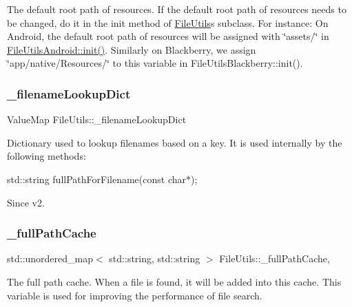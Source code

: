 The default root path of resources. If the default root path of resources needs to be changed, do it in the {\ttfamily init} method of \hyperlink{classFileUtils}{File\+Utils}\textquotesingle{}s subclass. For instance\+: On Android, the default root path of resources will be assigned with \char`\"{}assets/\char`\"{} in \hyperlink{classFileUtilsAndroid_a5ff9d802609690baa039ebef0508b2c6}{File\+Utils\+Android\+::init()}. Similarly on Blackberry, we assign \char`\"{}app/native/\+Resources/\char`\"{} to this variable in File\+Utils\+Blackberry\+::init(). \mbox{\label{classFileUtils_a3d6f18571f845268f614048092f74c76}} 
\subsubsection{\texorpdfstring{\+\_\+filename\+Lookup\+Dict}{\_filenameLookupDict}}
{\footnotesize\ttfamily Value\+Map File\+Utils\+::\+\_\+filename\+Lookup\+Dict\hspace{0.3cm}{\ttfamily [protected]}}

Dictionary used to lookup filenames based on a key. It is used internally by the following methods\+:

std\+::string full\+Path\+For\+Filename(const char$\ast$);

\begin{DoxySince}{Since}
v2. 
\end{DoxySince}
\mbox{\label{classFileUtils_a65bd3009aa5816155b0718744aacdf75}} 
\subsubsection{\texorpdfstring{\+\_\+full\+Path\+Cache}{\_fullPathCache}}
{\footnotesize\ttfamily std\+::unordered\+\_\+map$<$ std\+::string, std\+::string $>$ File\+Utils\+::\+\_\+full\+Path\+Cache\hspace{0.3cm}{\ttfamily [mutable]}, {\ttfamily [protected]}}

The full path cache. When a file is found, it will be added into this cache. This variable is used for improving the performance of file search.

